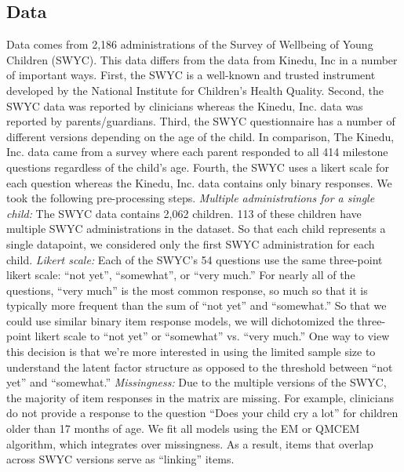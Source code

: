\documentclass[man]{apa7}
\begin{document}
\subsection*{Data}
Data comes from 2,186 administrations of the Survey of Wellbeing of Young Children (SWYC). This data differs from the data from Kinedu, Inc in a number of important ways. First, the SWYC is a well-known and trusted instrument developed by the National Institute for Children’s Health Quality. Second, the SWYC data was reported by clinicians whereas the Kinedu, Inc. data was reported by parents/guardians. Third, the SWYC questionnaire has a number of different versions depending on the age of the child. In comparison, The Kinedu, Inc. data came from a survey where each parent responded to all 414 milestone questions regardless of the child’s age. Fourth, the SWYC uses a likert scale for each question whereas the Kinedu, Inc. data contains only binary responses. We took the following pre-processing steps.
\textit{Multiple administrations for a single child:} The SWYC data contains 2,062 children. 113 of these children have multiple SWYC administrations in the dataset. So that each child represents a single datapoint, we considered only the first SWYC administration for each child.
\textit{Likert scale:} Each of the SWYC's 54 questions use the same three-point likert scale: “not yet”, “somewhat”, or “very much.” For nearly all of the questions, “very much” is the most common response, so much so that it is typically more frequent than the sum of “not yet” and “somewhat.” So that we could use similar binary item response models, we will dichotomized the three-point likert scale to “not yet” or “somewhat” vs. “very much.” One way to view this decision is that we’re more interested in using the limited sample size to understand the latent factor structure as opposed to the threshold between “not yet” and “somewhat.”
\textit{Missingness:} Due to the multiple versions of the SWYC, the majority of item responses in the matrix are missing. For example, clinicians do not provide a response to the question “Does your child cry a lot” for children older than 17 months of age. We fit all models using the EM or QMCEM algorithm, which integrates over missingness. As a result, items that overlap across SWYC versions serve as “linking” items.
\end{document}
